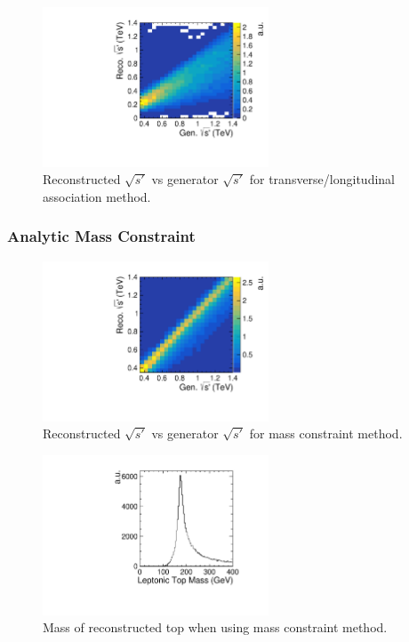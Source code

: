 \begin{figure}
  \centering
  \includegraphics[width=0.6\textwidth]{TopAnalysis/figures/CrudeEVsTrueE.pdf}
  \caption[Reconstructed $\sqrt{s'}$ vs generator $\sqrt{s'}$ for transverse/longitudinal association method]{Reconstructed $\sqrt{s'}$ vs generator $\sqrt{s'}$ for transverse/longitudinal association method.}
  \label{fig:simpleAssoication}
\end{figure}

\subsubsection{Analytic Mass Constraint}

\begin{figure}
  \centering
  \includegraphics[width=0.6\textwidth]{TopAnalysis/figures/AnalEVsTrueE.pdf}
  \caption[Reconstructed $\sqrt{s'}$ vs generator $\sqrt{s'}$ for mass constraint method]{Reconstructed $\sqrt{s'}$ vs generator $\sqrt{s'}$ for mass constraint method.}
  \label{fig:MassConstraint}
\end{figure}
\begin{figure}
  \centering
  \includegraphics[width=0.6\textwidth]{TopAnalysis/figures/AnalTopMass.pdf}
  \caption[Mass of reconstructed leptonic top when using mass constraint method]{Mass of reconstructed top when using mass constraint method.}
  \label{fig:TopMassFrommassMethod}
\end{figure}

